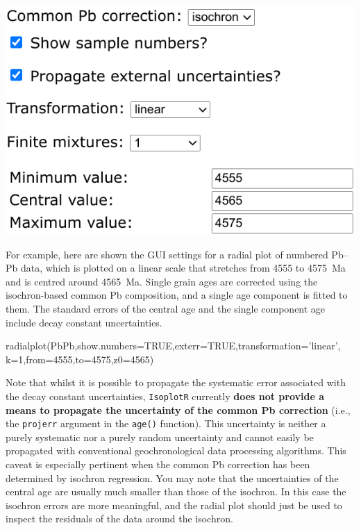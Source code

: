 \begin{refsection}
\noindent\begin{minipage}[t]{.45\linewidth}
\strut\vspace*{-\baselineskip}\newline
\includegraphics[width=\linewidth]{../figures/PbPbRadialOptions.png}
\end{minipage}
\begin{minipage}[t]{.55\linewidth}
  For example, here are shown the GUI settings for a radial plot of
  numbered Pb--Pb data, which is plotted on a linear scale that
  stretches from 4555 to 4575~Ma and is centred around 4565~Ma. Single
  grain ages are corrected using the isochron-based common Pb
  composition, and a single age component is fitted to them. The
  standard errors of the central age and the single component age
  include decay constant uncertainties.
\end{minipage}

\begin{console}
radialplot(PbPb,show.numbers=TRUE,exterr=TRUE,transformation='linear',
           k=1,from=4555,to=4575,z0=4565)
\end{console}

Note that whilst it is possible to propagate the systematic error
associated with the decay constant uncertainties, \texttt{IsoplotR}
currently \textbf{does not provide a means to propagate the
  uncertainty of the common Pb correction} (i.e., the \texttt{projerr}
argument in the \texttt{age()} function). This uncertainty is neither
a purely systematic nor a purely random uncertainty and cannot easily
be propagated with conventional geochronological data processing
algorithms. This caveat is especially pertinent when the common Pb
correction has been determined by isochron regression. You may note
that the uncertainties of the central age are usually much smaller
than those of the isochron. In this case the isochron errors are more
meaningful, and the radial plot should just be used to inspect the
residuals of the data around the isochron.\\


\end{refsection}
